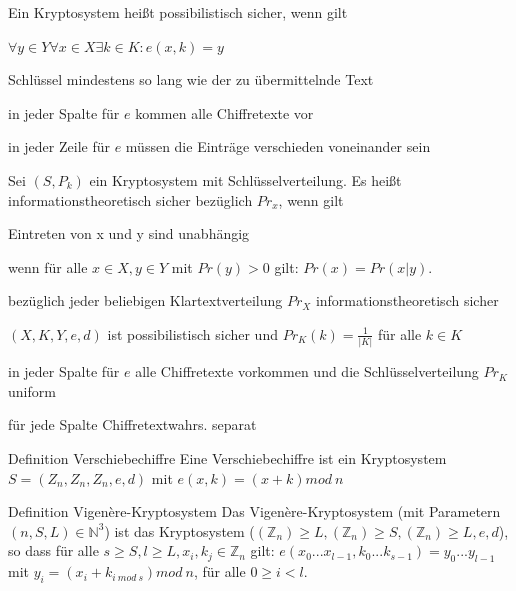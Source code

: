 \documentclass[avery5371, frame]{flashcards}
\begin{document}
\begin{flashcard}[Kryptosysteme]{Ein Kryptosystem heißt possibilistisch sicher, wenn gilt}
    \begin{itemize*}
        \item $\forall y\in Y\forall x\in X\exists k\in K:e(x,k)=y$
        \item Schlüssel mindestens so lang wie der zu übermittelnde Text
        \item in jeder Spalte für $e$ kommen alle Chiffretexte vor
        \item in jeder Zeile für $e$ müssen die Einträge verschieden voneinander sein
    \end{itemize*}
\end{flashcard}

\begin{flashcard}[Kryptosysteme]{Sei $(S,P_k)$ ein Kryptosystem mit Schlüsselverteilung. Es heißt informationstheoretisch sicher bezüglich $Pr_x$, wenn gilt}
    \begin{itemize*}
        \item Eintreten von x und y sind unabhängig
        \item wenn für alle $x\in X,y\in Y$ mit $Pr(y)>0$ gilt: $Pr(x) = Pr(x|y)$.
        \item bezüglich jeder beliebigen Klartextverteilung $Pr_X$ informationstheoretisch sicher
        \item $(X,K,Y,e,d)$ ist possibilistisch sicher und $Pr_K(k)=\frac{1}{|K|}$ für alle $k\in K$
        \item in jeder Spalte für $e$ alle Chiffretexte vorkommen und die Schlüsselverteilung $Pr_K$ uniform
        \item für jede Spalte Chiffretextwahrs. separat
    \end{itemize*}
\end{flashcard}

\begin{flashcard}{Definition Verschiebechiffre}
    Eine Verschiebechiffre ist ein Kryptosystem $S=(Z_n,Z_n,Z_n,e,d)$ mit $e(x,k)=(x+k) mod\ n$
\end{flashcard}

\begin{flashcard}{Definition Vigenère-Kryptosystem}
    Das Vigenère-Kryptosystem (mit Parametern $(n,S,L)\in\mathbb{N}^3$) ist das Kryptosystem ($(\mathbb{Z}_n)\geq L,(\mathbb{Z}_n)\geq S,(\mathbb{Z}_n)\geq L,e,d$), so dass für alle $s\geq S,l\geq L,x_i,k_j\in\mathbb{Z}_n$ gilt: $e(x_0...x_{l-1},k_0 ...k_{s-1})=y_0 ...y_{l-1}$ mit $y_i=(x_i+k_{i\ mod\ s}) mod\ n$, für alle $0\geq i < l$.
\end{flashcard}
\end{document}
